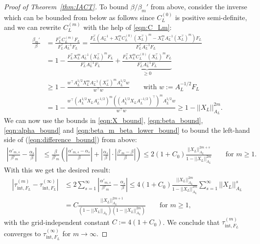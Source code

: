 \documentclass[11pt,english]{article}
\theoremstyle{plain}
\theoremstyle{plain}
\theoremstyle{plain}
\theoremstyle{plain}
\numberwithin{equation}{section}
\newcommand{\rev}[1]{#1}
\begin{document}
\begin{proof}[Proof of Theorem~\ref{thm:IACT}]
	To bound $\beta/\beta_m'$ from above, consider the inverse which can be bounded from below as follows since $C_L^{(0)}$ is positive semi-definite, and we can rewrite $C_L^{(m)}$ with the help of \eqref{eqn:C_Lm}:
	\begin{equation}
		\begin{aligned}
			\frac{\beta_m'}{\beta} & = \frac{F_{L}^{\top} C_L^{(m)}F_{L}}{F_{L}^{\top}A_L^{-1}F_{L}}
			= \frac{F_{L}^{\top} \left(A_L^{-1}+X_L^m C_L^{(0)}(X_L^\top)^m - X_L^m A_L^{-1}(X_L^\top)^m\right)F_{L}}{F_{L}^{\top}A_L^{-1}F_{L}}                                \\
			                       & = 1 - \frac{F_{L}^{\top}X_L^m A_L^{-1} (X_L^\top)^m F_{L}}{F_{L}^{\top}A_L^{-1}F_{L}} +
			\underbrace{\frac{F_{L}^{\top}X_L^m C_L^{(0)} (X_L^\top)^m F_{L}}{F_{L}^{\top}A_L^{-1}F_{L}}}_{\ge 0}                                                               \\
			                       & \ge 1 - \frac{w^\top A_L^{1/2} X_L^m A_L^{-1}(X_L^\top)^m A_L^{1/2}w}{w^\top w}\qquad\text{with $w:= A_L^{-1/2}F_{L}$}      \\
			                       & = 1 - \frac{w^\top \left(A_L^{1/2} X_L A_L^{-1/2}\right)^m \left((A_L^{1/2}X_L A_L^{-1/2})^\top\right)^m A_L^{1/2}w}{w^\top w}  \ge 1-||X_L||_{A_L}^{2m}.
		\end{aligned}\label{eqn:beta_m_beta_lower_bound}
	\end{equation}
	We can now use the bounds in \eqref{eqn:X_bound}, \eqref{eqn:beta_bound}, \eqref{eqn:alpha_bound} and \eqref{eqn:beta_m_beta_lower_bound} to bound the left-hand side of
	(\ref{eqn:difference_bound}) from above:
	\begin{equation}
		\begin{aligned}\left|\frac{\alpha'_{m,s}}{\beta'_{m}}-\frac{\alpha_{s}}{\beta}\right| & \le \frac{\beta}{\beta'_{m}} \left(\left|\frac{\alpha'_{m,s}-\alpha_{s}}{\beta}\right|+\left|\frac{\alpha_{s}}{\beta}\right|\cdot\left|\frac{\beta'_{m}-\beta}{\beta}\right|\right)  \le2(1+C_0) \frac{||X_{L}||_{A_{L}}^{2m+s}}{1-||X_L||_{A_L}^{2m}}\qquad\text{for $m\ge 1$}.
		\end{aligned}
	\end{equation}
	With this we get the desired result:
	\begin{equation}
		\begin{aligned}|\tau_{\mathrm{int},F_{L}}^{(m)}-\rev{\tau^{(\infty)}_{\mathrm{int},F_L}}| & \le2\sum_{s=1}^{\infty}\left|\frac{\alpha'_{m,s}}{\beta'_{m}}-\frac{\alpha_{s}}{\beta}\right|                                           \le4(1+C_0)\frac{||X_{L}||_{A_{L}}^{2m}}{1-||X_L||_{A_L}^{2m}}\sum_{s=1}^{\infty}||X_{L}||_{A_{L}}^{s} \\
                                                                       & =C\frac{||X_{L}||_{A_{L}}^{2m+1}}{(1-||X_{L}||_{A_{L}})(1-||X_L||_{A_L}^{2m})}  \qquad\text{for $m\ge 1$},
		\end{aligned}\label{eqn:tau_difference_bound}
	\end{equation}
	with the grid-independent constant $C:= 4(1+C_0)$. We conclude that $\tau_{\mathrm{int},F_{L}}^{(m)}$ converges to $\rev{\tau^{(\infty)}_{\mathrm{int},F_L}}$ for $m\rightarrow\infty$.
\end{proof}
\end{document}
